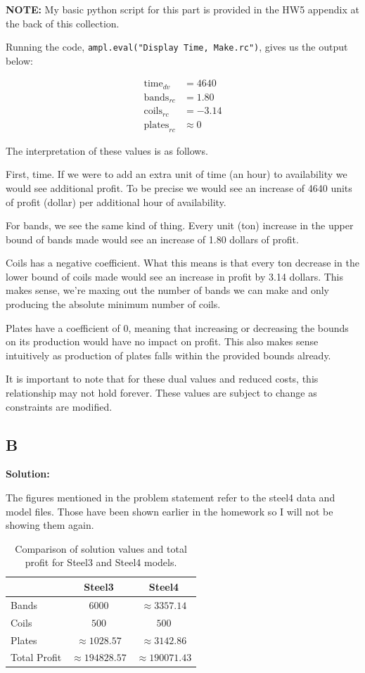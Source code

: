 \sol

\textbf{NOTE:} My basic python script for this part is provided in the HW5 appendix at the back of this collection.


Running the code, \texttt{ampl.eval("Display Time, Make.rc")}, gives us the output below:

\begin{align*}
	\text{time}_{dv} &= 4640 \\
	\text{bands}_{rc} &= 1.80 \\
	\text{coils}_{rc} &= -3.14 \\
	\text{plates}_{rc} &\approx 0
\end{align*}

The interpretation of these values is as follows. 

First, time. If we were to add an extra unit of time (an hour) to availability we would see additional profit. To be precise we would see an increase of 4640 units of profit (dollar) per additional hour of availability. 

For bands, we see the same kind of thing. Every unit (ton) increase in the upper bound of bands made would see an increase of 1.80 dollars of profit. 

Coils has a negative coefficient. What this means is that every ton decrease in the lower bound of coils made would see an increase in profit by 3.14 dollars. This makes sense, we're maxing out the number of bands we can make and only producing the absolute minimum number of coils. 

Plates have a coefficient of 0, meaning that increasing or decreasing the bounds on its production would have no impact on profit. This also makes sense intuitively as production of plates falls within the provided bounds already. 

It is important to note that for these dual values and reduced costs, this relationship may not hold forever. These values are subject to change as constraints are modified.

\subsection*{B}

\noindent\textbf{Solution:}

The figures mentioned in the problem statement refer to the steel4 data and model files. Those have been shown earlier in the homework so I will not be showing them again. 

\begin{table}[h!]
\centering
\begin{tabular}{lcc}
\hline
 & \textbf{Steel3} & \textbf{Steel4} \\
\hline
Bands  & $6000$       & $\approx 3357.14$ \\
Coils  & $500$        & $500$ \\
Plates & $\approx 1028.57$ & $\approx 3142.86$ \\
Total Profit & $\approx 194828.57$ & $\approx 190071.43$ \\
\hline
\end{tabular}
\caption{Comparison of solution values and total profit for Steel3 and Steel4 models.}
\end{table}

